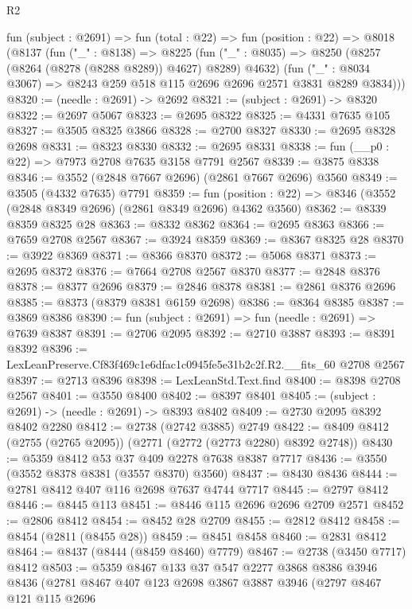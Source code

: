 \begin{lexlean}{R2}
\begin{coremodule}
  fun (subject : @2691) =>
  fun (total : @22) =>
  fun (position : @22) =>
  @8018
    (@8137
      (fun ("_" : @8138) =>
      @8225
        (fun ("_" : @8035) => @8250 (@8257 (@8264 (@8278 (@8288 @8289)) @4627) @8289) @4632)
        (fun ("_" : @8034 @3067) => @8243 @259 @518 @115 @2696 @2696 @2571 @3831 @8289 @3834)))
@8320 := (needle : @2691) -> @2692
@8321 := (subject : @2691) -> @8320
@8322 := @2697 @5067
@8323 := @2695 @8322
@8325 := @4331 @7635 @105
@8327 := @3505 @8325 @3866
@8328 := @2700 @8327
@8330 := @2695 @8328 @2698
@8331 := @8323 @8330
@8332 := @2695 @8331
@8338 := fun (__p0 : @22) => @7973 @2708 @7635 @3158 @7791 @2567
@8339 := @3875 @8338
@8346 := @3552 (@2848 @7667 @2696) (@2861 @7667 @2696) @3560
@8349 := @3505 (@4332 @7635) @7791
@8359 := fun (position : @22) => @8346 (@3552 (@2848 @8349 @2696) (@2861 @8349 @2696) @4362 @3560)
@8362 := @8339 @8359 @8325 @28
@8363 := @8332 @8362
@8364 := @2695 @8363
@8366 := @7659 @2708 @2567
@8367 := @3924 @8359
@8369 := @8367 @8325 @28
@8370 := @3922 @8369
@8371 := @8366 @8370
@8372 := @5068 @8371
@8373 := @2695 @8372
@8376 := @7664 @2708 @2567 @8370
@8377 := @2848 @8376
@8378 := @8377 @2696
@8379 := @2846 @8378
@8381 := @2861 @8376 @2696
@8385 := @8373 (@8379 @8381 @6159 @2698)
@8386 := @8364 @8385
@8387 := @3869 @8386
@8390 := fun (subject : @2691) => fun (needle : @2691) => @7639 @8387
@8391 := @2706 @2095
@8392 := @2710 @3887
@8393 := @8391 @8392
@8396 := LexLeanPreserve.Cf83f469c1e6dfac1c0945fe5e31b2c2f.R2.__fits_60 @2708 @2567
@8397 := @2713 @8396
@8398 := LexLeanStd.Text.find
@8400 := @8398 @2708 @2567
@8401 := @3550 @8400
@8402 := @8397 @8401
@8405 := (subject : @2691) -> (needle : @2691) -> @8393 @8402
@8409 := @2730 @2095 @8392 @8402 @2280
@8412 := @2738 (@2742 @3885) @2749
@8422 := @8409 @8412 (@2755 (@2765 @2095)) (@2771 (@2772 (@2773 @2280) @8392 @2748))
@8430 := @5359 @8412 @53 @37 @409 @2278 @7638 @8387 @7717
@8436 := @3550 (@3552 @8378 @8381 (@3557 @8370) @3560)
@8437 := @8430 @8436
@8444 := @2781 @8412 @407 @116 @2698 @7637 @4744 @7717
@8445 := @2797 @8412
@8446 := @8445 @113
@8451 := @8446 @115 @2696 @2696 @2709 @2571
@8452 := @2806 @8412
@8454 := @8452 @28 @2709
@8455 := @2812 @8412
@8458 := @8454 (@2811 (@8455 @28))
@8459 := @8451 @8458
@8460 := @2831 @8412
@8464 := @8437 (@8444 (@8459 @8460) @7779)
@8467 := @2738 (@3450 @7717) @8412
@8503 := @5359
    @8467
    @133
    @37
    @547
    @2277
    @3868
    @8386
    @3946
    @8436
    (@2781
      @8467
      @407
      @123
      @2698
      @3867
      @3887
      @3946
      (@2797
        @8467
        @121
        @115
        @2696

\end{coremodule}
\end{lexlean}

